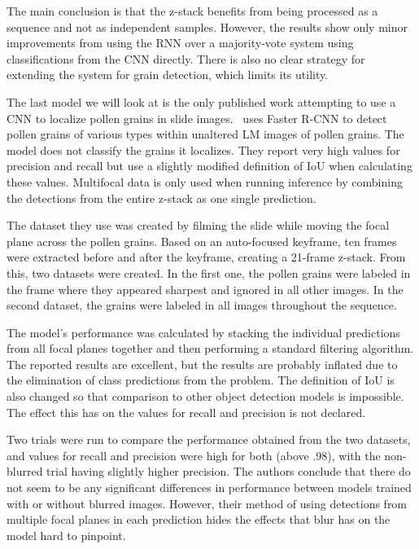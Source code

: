 The main conclusion is that the z-stack benefits from being processed as a sequence and not as independent samples. However, the results show only minor improvements from using the RNN over a majority-vote system using classifications from the CNN directly.
There is also no clear strategy for extending the system for grain detection, which limits its utility.

The last model we will look at is the only published work attempting to use a CNN to localize pollen grains in slide images.\ \textcite{gallardo_caballero_precise_2019} uses Faster R-CNN to detect pollen grains of various types within unaltered LM images of pollen grains.
The model does not classify the grains it localizes.
They report very high values for precision and recall but use a slightly modified definition of IoU when calculating these values.
Multifocal data is only used when running inference by combining the detections from the entire z-stack as one single prediction.

The dataset they use was created by filming the slide while moving the focal plane across the pollen grains.
Based on an auto-focused keyframe, ten frames were extracted before and after the keyframe, creating a 21-frame z-stack.
From this, two datasets were created.
In the first one, the pollen grains were labeled in the frame where they appeared sharpest and ignored in all other images.
In the second dataset, the grains were labeled in all images throughout the sequence.

The model's performance was calculated by stacking the individual predictions from all focal planes together and then performing a standard filtering algorithm.
The reported results are excellent, but the results are probably inflated due to the elimination of class predictions from the problem.
The definition of IoU is also changed so that comparison to other object detection models is impossible.
The effect this has on the values for recall and precision is not declared.

Two trials were run to compare the performance obtained from the two datasets, and values for recall and precision were high for both (above .98), with the non-blurred trial having slightly higher precision.
The authors conclude that there do not seem to be any significant differences in performance between models trained with or without blurred images. However, their method of using detections from multiple focal planes in each prediction hides the effects that blur has on the model hard to pinpoint.

